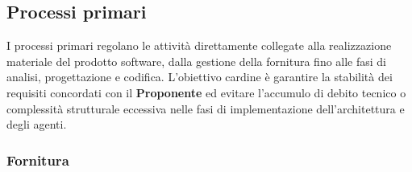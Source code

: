 \documentclass[12pt, a4paper]{article}
\begin{document}
\subsection{Processi primari}
I processi primari regolano le attività direttamente collegate alla realizzazione materiale del prodotto software, dalla gestione della fornitura fino alle fasi di analisi, progettazione e codifica.
L'obiettivo cardine è garantire la stabilità dei requisiti concordati con il \textbf{Proponente} ed evitare l'accumulo di debito tecnico o complessità strutturale eccessiva nelle fasi di implementazione dell'architettura e degli agenti.

\subsubsection{Fornitura}
\renewcommand{\arraystretch}{1.3}
\end{document}
